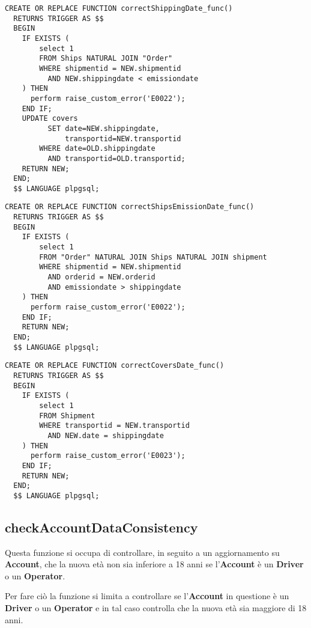 \begin{lstlisting}[caption={Funzione \textbf{correctShippingDate}}]
  CREATE OR REPLACE FUNCTION correctShippingDate_func()
  RETURNS TRIGGER AS $$
  BEGIN
    IF EXISTS (
        select 1 
        FROM Ships NATURAL JOIN "Order"
        WHERE shipmentid = NEW.shipmentid
          AND NEW.shippingdate < emissiondate
    ) THEN
      perform raise_custom_error('E0022');
    END IF;
    UPDATE covers 
          SET date=NEW.shippingdate, 
              transportid=NEW.transportid 
        WHERE date=OLD.shippingdate 
          AND transportid=OLD.transportid;
    RETURN NEW;
  END;
  $$ LANGUAGE plpgsql;
\end{lstlisting}

\begin{lstlisting}[caption={Funzione \textbf{correctShipsEmissionDate}}]
  CREATE OR REPLACE FUNCTION correctShipsEmissionDate_func()
  RETURNS TRIGGER AS $$
  BEGIN
    IF EXISTS (
        select 1 
        FROM "Order" NATURAL JOIN Ships NATURAL JOIN shipment
        WHERE shipmentid = NEW.shipmentid 
          AND orderid = NEW.orderid
          AND emissiondate > shippingdate
    ) THEN
      perform raise_custom_error('E0022');
    END IF;
    RETURN NEW;
  END;
  $$ LANGUAGE plpgsql;
\end{lstlisting}

\begin{lstlisting}[caption={Funzione \textbf{correctCoversDate}}]
  CREATE OR REPLACE FUNCTION correctCoversDate_func()
  RETURNS TRIGGER AS $$
  BEGIN
    IF EXISTS (
        select 1 
        FROM Shipment
        WHERE transportid = NEW.transportid
          AND NEW.date = shippingdate
    ) THEN
      perform raise_custom_error('E0023');
    END IF;
    RETURN NEW;
  END;
  $$ LANGUAGE plpgsql;
\end{lstlisting}

\subsection{\textbf{checkAccountDataConsistency}}

Questa funzione si occupa di controllare, in seguito a un aggiornamento su \textbf{Account}, che la nuova età non sia inferiore a 18 anni se l'\textbf{Account} è un \textbf{Driver} o un \textbf{Operator}.

Per fare ciò la funzione si limita a controllare se l'\textbf{Account} in questione è un \textbf{Driver} o un \textbf{Operator} e in tal caso controlla che la nuova età sia maggiore di 18 anni.

